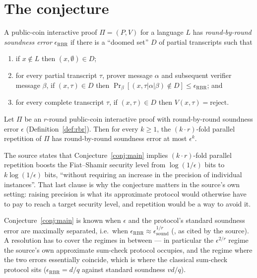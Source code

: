 \documentclass{aicr-conjecture}
\newcommand{\eps}{\epsilon}
\newcommand{\Ver}{V}
\newcommand{\Prov}{P}
\begin{document}
\section{The conjecture}\label{sec:conjectures}

\begin{definition}
  \label{def:rbr}
A public-coin interactive proof $\Pi = (\Prov, \Ver)$ for a language $L$
has \emph{round-by-round soundness error} $\eps_{\mathrm{RBR}}$ if there
is a ``doomed set'' $D$ of partial transcripts such that
\begin{enumerate}[nosep,label=(\arabic*)]
  \item if $x \notin L$ then $(x, \emptyset) \in D$;
  \item for every partial transcript $\tau$, prover message $\alpha$ and
    subsequent verifier message $\beta$, if $(x,\tau) \in D$ then
    $\Pr_{\beta}[(x, \tau|\alpha|\beta) \notin D] \le
    \eps_{\mathrm{RBR}}$; and
  \item for every complete transcript $\tau$, if $(x,\tau) \in D$ then
    $\Ver(x,\tau) = \mathrm{reject}$.
\end{enumerate}
\end{definition}

\begin{conjecture}\label{conj:main}
Let $\Pi$ be an $r$-round public-coin interactive proof with
round-by-round soundness error $\eps$ (Definition~\ref{def:rbr}). Then
for every $k \ge 1$, the $(k \cdot r)$-fold parallel repetition of $\Pi$
has round-by-round soundness error at most $\eps^{k}$.
\end{conjecture}

\begin{remark}
The source states that Conjecture~\ref{conj:main} implies $(k \cdot
r)$-fold parallel repetition boosts the Fiat--Shamir security level from
$\log(1/\eps)$ bits to $k \log(1/\eps)$ bits, ``without requiring an
increase in the precision of individual instances''. That last clause is
why the conjecture matters in the source's own setting: raising precision
is what its approximate protocol would otherwise have to pay to reach a
target security level, and repetition would be a way to avoid it.
\end{remark}

\begin{remark}\label{rem:known}
Conjecture~\ref{conj:main} is known when $\eps$ and the protocol's
standard soundness error are maximally separated, i.e.\ when
$\eps_{\mathrm{RBR}} \approx \eps_{\mathrm{sound}}^{1/r}$
(\cite[Corollary 5.7]{CCH+18}, as cited by the source). A resolution has
to cover the regimes in between --- in particular the $\eps^{2/r}$ regime
the source's own approximate sum-check protocol occupies, and the regime
where the two errors essentially coincide, which is where the classical
sum-check protocol sits ($\eps_{\mathrm{RBR}} = d/q$ against standard
soundness $vd/q$).
\end{remark}
\end{document}
